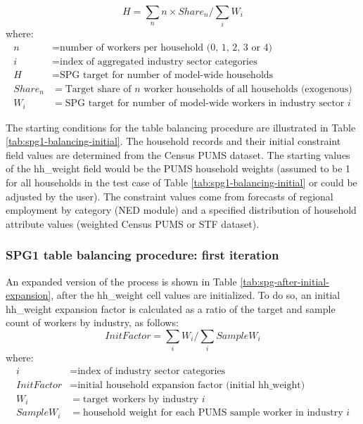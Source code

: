 \begin{equation}
H = \sum_n n \times Share_n / \sum_i W_i
\end{equation}
\noindent where:
\begin{align*}
n &= \text{number of workers per household (0, 1, 2, 3 or 4)} \\
i &= \text{index of aggregated industry sector categories} \\
H &= \text{SPG target for number of model-wide households} \\
Share_n &= \text{Target share of $n$ worker households of all households (exogenous)} \\
W_i &= \text{SPG target for number of model-wide workers in industry sector $i$}
\end{align*}

The starting conditions for the table balancing procedure are illustrated in Table \ref{tab:spg1-balancing-initial}. The household records and their initial constraint field values are determined from the Census PUMS dataset. The starting values of the hh\_weight field would be the PUMS household weights (assumed to be 1 for all households in the test case of Table \ref{tab:spg1-balancing-initial} or could be adjusted by the user). The constraint values come from forecasts of regional employment by category (NED module) and a specified distribution of household attribute values (weighted Census PUMS or STF dataset).

\subsubsection{SPG1 table balancing procedure: first iteration}

An expanded version of the process is shown in Table \ref{tab:spg-after-initial-expansion}, after the hh\_weight cell values are initialized. To do so, an initial hh\_weight expansion factor is calculated as a ratio of the target and sample count of workers by industry, as follows:
\begin{equation}
InitFactor = \sum_i W_i / \sum_i SampleW_i
\end{equation}
\noindent where:
\begin{align*}
i &= \text{index of industry sector categories} \\
InitFactor &= \text{initial household expansion factor (initial hh\_weight)} \\
W_i &= \text{target workers by industry $i$} \\
SampleW_i &= \text{household weight for each PUMS sample worker in industry $i$}
\end{align*}

